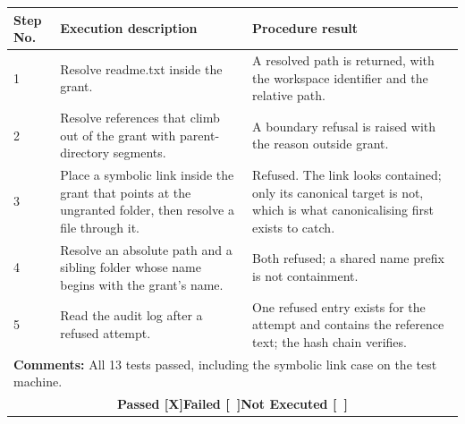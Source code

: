 \documentclass{FastFyp}
\begin{document}
{\begin{longtable}{|p{2.4cm}p{5.0cm}p{2.4cm}p{3.8cm}|}
\multicolumn{1}{|p{2.4cm}|}{\textbf{Step No.}} &
  \multicolumn{1}{p{5.0cm}|}{\textbf{Execution description}} &
  \multicolumn{2}{p{6.6cm}|}{\textbf{Procedure result}} \\ \hline
\multicolumn{1}{|p{2.4cm}|}{1} & \multicolumn{1}{p{5.0cm}|}{Resolve readme.txt inside the grant.} & \multicolumn{2}{p{6.6cm}|}{A resolved path is returned, with the workspace identifier and the relative path.} \\ \hline
\multicolumn{1}{|p{2.4cm}|}{2} & \multicolumn{1}{p{5.0cm}|}{Resolve references that climb out of the grant with parent-directory segments.} & \multicolumn{2}{p{6.6cm}|}{A boundary refusal is raised with the reason outside grant.} \\ \hline
\multicolumn{1}{|p{2.4cm}|}{3} & \multicolumn{1}{p{5.0cm}|}{Place a symbolic link inside the grant that points at the ungranted folder, then resolve a file through it.} & \multicolumn{2}{p{6.6cm}|}{Refused. The link looks contained; only its canonical target is not, which is what canonicalising first exists to catch.} \\ \hline
\multicolumn{1}{|p{2.4cm}|}{4} & \multicolumn{1}{p{5.0cm}|}{Resolve an absolute path and a sibling folder whose name begins with the grant's name.} & \multicolumn{2}{p{6.6cm}|}{Both refused; a shared name prefix is not containment.} \\ \hline
\multicolumn{1}{|p{2.4cm}|}{5} & \multicolumn{1}{p{5.0cm}|}{Read the audit log after a refused attempt.} & \multicolumn{2}{p{6.6cm}|}{One refused entry exists for the attempt and contains the reference text; the hash chain verifies.} \\ \hline
\multicolumn{4}{|p{14.8cm}|}{\textbf{Comments:} All 13 tests passed, including the symbolic link case on the test machine.} \\ \hline
\multicolumn{4}{|c|}{\textbf{Passed [X]\quad Failed [\ ]\quad Not Executed [\ ]}} \\ \hline
\end{longtable}
}
\end{document}

